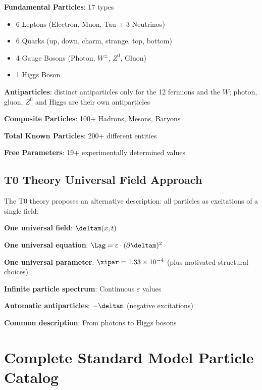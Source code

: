 	\begin{tcolorbox}[colback=red!5!white,colframe=red!75!black,title=Standard Model: Particles and Parameters]
		\textbf{Fundamental Particles}: 17 types
		\begin{itemize}
			\item 6 Leptons (Electron, Muon, Tau + 3 Neutrinos)
			\item 6 Quarks (up, down, charm, strange, top, bottom)
			\item 4 Gauge Bosons (Photon, $W^{\pm}$, $Z^0$, Gluon)
			\item 1 Higgs Boson
		\end{itemize}
		
		\textbf{Antiparticles}: distinct antiparticles only for the 12 fermions and the $W$; photon, gluon, $Z^0$ and Higgs are their own antiparticles
		
		\textbf{Composite Particles}: 100+ Hadrons, Mesons, Baryons
		
		\textbf{Total Known Particles}: 200+ different entities
		
		\textbf{Free Parameters}: 19+ experimentally determined values
	\end{tcolorbox}
	
	\subsection{T0 Theory Universal Field Approach}
	
	The T0 theory proposes an alternative description: all particles as excitations of a single field:
	
	\begin{tcolorbox}[colback=blue!5!white,colframe=blue!75!black,title=T0 Universal Field Simplification]
		\textbf{One universal field}: $\deltam(x,t)$
		
		\textbf{One universal equation}: $\Lag = \varepsilon \cdot (\partial \deltam)^2$
		
		\textbf{One universal parameter}: $\xipar = 1.33 \times 10^{-4}$ (plus motivated structural choices)
		
		\textbf{Infinite particle spectrum}: Continuous $\varepsilon$ values
		
		\textbf{Automatic antiparticles}: $-\deltam$ (negative excitations)
		
		\textbf{Common description}: From photons to Higgs bosons
	\end{tcolorbox}
	
	\section{Complete Standard Model Particle Catalog}
	
